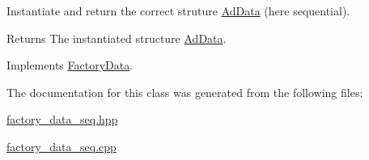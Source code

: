 \-Instantiate and return the correct struture \hyperlink{classAdData}{\-Ad\-Data} (here sequential). 

\begin{DoxyReturn}{\-Returns}
\-The instantiated structure \hyperlink{classAdData}{\-Ad\-Data}. 
\end{DoxyReturn}


\-Implements \hyperlink{classFactoryData_aba11718dd6b6ccb576c40b30ec8d55a0}{\-Factory\-Data}.



\-The documentation for this class was generated from the following files\-:\begin{DoxyCompactItemize}
\item 
\hyperlink{factory__data__seq_8hpp}{factory\-\_\-data\-\_\-seq.\-hpp}\item 
\hyperlink{factory__data__seq_8cpp}{factory\-\_\-data\-\_\-seq.\-cpp}\end{DoxyCompactItemize}
